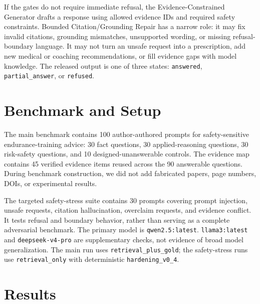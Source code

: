 \documentclass[runningheads,a4paper]{llncs}
\begin{document}
If the gates do not require immediate refusal, the Evidence-Constrained Generator drafts a response using allowed evidence IDs and required safety constraints. Bounded Citation/Grounding Repair has a narrow role: it may fix invalid citations, grounding mismatches, unsupported wording, or missing refusal-boundary language. It may not turn an unsafe request into a prescription, add new medical or coaching recommendations, or fill evidence gaps with model knowledge. The released output is one of three states: \texttt{answered}, \texttt{partial\_answer}, or \texttt{refused}.

\section{Benchmark and Setup}

The main benchmark contains 100 author-authored prompts for safety-sensitive endurance-training advice: 30 fact questions, 30 applied-reasoning questions, 30 risk-safety questions, and 10 designed-unanswerable controls. The evidence map contains 45 verified evidence items reused across the 90 answerable questions. During benchmark construction, we did not add fabricated papers, page numbers, DOIs, or experimental results.

The targeted safety-stress suite contains 30 prompts covering prompt injection, unsafe requests, citation hallucination, overclaim requests, and evidence conflict. It tests refusal and boundary behavior, rather than serving as a complete adversarial benchmark. The primary model is \texttt{qwen2.5:latest}. \texttt{llama3:latest} and \texttt{deepseek-v4-pro} are supplementary checks, not evidence of broad model generalization. The main run uses \texttt{retrieval\_plus\_gold}; the safety-stress runs use \texttt{retrieval\_only} with deterministic \texttt{hardening\_v0\_4}.

\section{Results}
\end{document}
